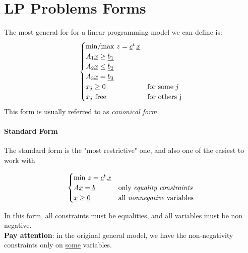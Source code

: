     \section{LP Problems Forms}
        The most general for for a linear programming model we can define is:
        \begin{equation}
            \begin{cases}
                \text{min/max } z = \underline{c}^t\, \underline{x}\\
                A_1\underline{x} \geq \underline{b_1}\\
                A_2\underline{x} \leq \underline{b_2}\\
                A_3\underline{x} = \underline{b_3}\\
                x_j \geq 0 &\text{for some \emph{j}}\\
                x_j \text{ free} & \text{for others j}
            \end{cases}
        \end{equation}
        This form is usually referred to as \textit{canonical form}.

        \paragraph{Standard Form}
            The standard form is the "most restrictive" one, and also one of the easiest to work with
            \begin{definition}
                \begin{equation}
                    \begin{cases}
                        \text{min } z = \underline{c}^t\, \underline{x}\\
                        A\underline{x} = \underline{b} & \text{only \emph{equality constraints}}\\
                        \underline{x} \geq \underline{0} & \text{all \emph{nonnegative} variables}
                    \end{cases}
                \end{equation}
            \end{definition}
            In this form, all constraints must be equalities, and all variables must be non negative.\\
            \textbf{Pay attention}: in the original general model, we have the non-negativity constraints only on \underline{some} variables.

